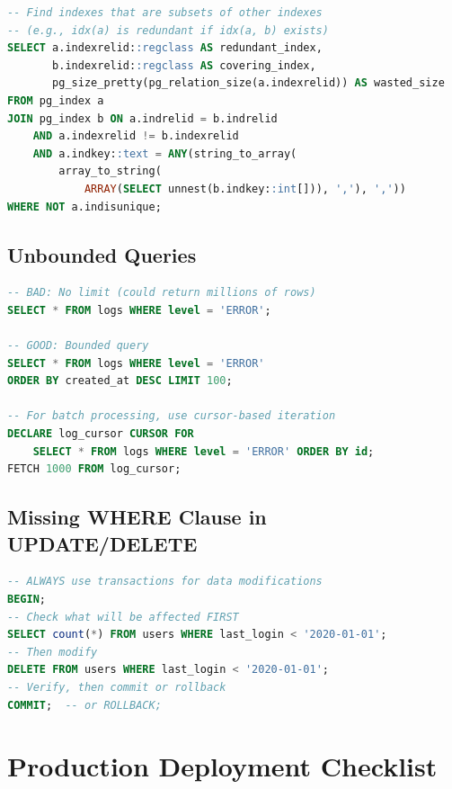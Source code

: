 \documentclass[12pt,a4paper]{article}
\begin{document}
\begin{lstlisting}[language=SQL, caption={Finding redundant indexes}]
-- Find indexes that are subsets of other indexes
-- (e.g., idx(a) is redundant if idx(a, b) exists)
SELECT a.indexrelid::regclass AS redundant_index,
       b.indexrelid::regclass AS covering_index,
       pg_size_pretty(pg_relation_size(a.indexrelid)) AS wasted_size
FROM pg_index a
JOIN pg_index b ON a.indrelid = b.indrelid
    AND a.indexrelid != b.indexrelid
    AND a.indkey::text = ANY(string_to_array(
        array_to_string(
            ARRAY(SELECT unnest(b.indkey::int[])), ','), ','))
WHERE NOT a.indisunique;
\end{lstlisting}

\subsection{Unbounded Queries}

\begin{lstlisting}[language=SQL, caption={Always use LIMIT}]
-- BAD: No limit (could return millions of rows)
SELECT * FROM logs WHERE level = 'ERROR';

-- GOOD: Bounded query
SELECT * FROM logs WHERE level = 'ERROR'
ORDER BY created_at DESC LIMIT 100;

-- For batch processing, use cursor-based iteration
DECLARE log_cursor CURSOR FOR
    SELECT * FROM logs WHERE level = 'ERROR' ORDER BY id;
FETCH 1000 FROM log_cursor;
\end{lstlisting}

\subsection{Missing WHERE Clause in UPDATE/DELETE}

\begin{lstlisting}[language=SQL, caption={Safe update practices}]
-- ALWAYS use transactions for data modifications
BEGIN;
-- Check what will be affected FIRST
SELECT count(*) FROM users WHERE last_login < '2020-01-01';
-- Then modify
DELETE FROM users WHERE last_login < '2020-01-01';
-- Verify, then commit or rollback
COMMIT;  -- or ROLLBACK;
\end{lstlisting}


\section{Production Deployment Checklist}
\end{document}
